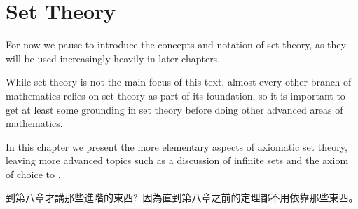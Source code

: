 \chapter{Set Theory} \label{ch3}

For now we pause to introduce the concepts and notation of set theory, as they will be used increasingly heavily in
later chapters.

While set theory is not the main focus of this text, almost every other branch of mathematics relies on set theory as part of its foundation, so it is important to get at least some grounding in set theory before doing other advanced areas of mathematics.

In this chapter we present the more elementary aspects of axiomatic set theory, leaving more advanced topics such as a discussion of infinite sets and the axiom of choice to
.

\begin{note}
到第八章才講那些進階的東西?\ 因為直到第八章之前的定理都不用依靠那些東西。
\end{note}


